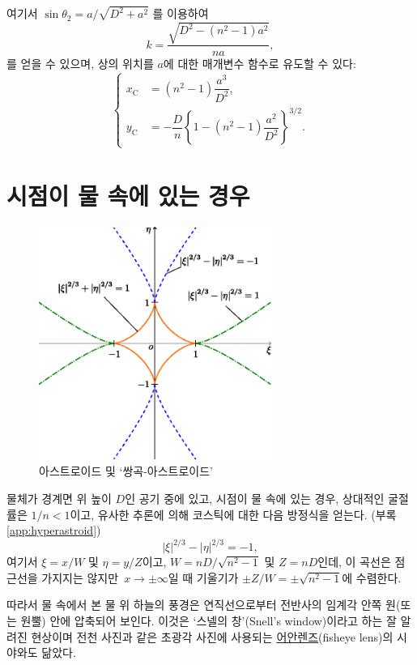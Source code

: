 \documentclass[twocolumn]{article}
\begin{document}
여기서
$\sin\theta_2 = {a}/{\sqrt{D^2+a^2}}$
를 이용하여
$$k = \dfrac{\sqrt{D^2-(n^2-1)a^2}}{na},$$
를 얻을 수 있으며, 
상의 위치를 $a$에 대한 매개변수 함수로 유도할 수 있다:
$$ \left\{ 
\begin{aligned}
	x_{\mathrm{C}}^{} &= (n^2-1)\dfrac{a^3}{D^2},\\
	y_{\mathrm{C}}^{}
	&= -\dfrac{D}{n}\left\{ 1-(n^2-1)\dfrac{a^2}{D^2} \right\}^{3/2}.
\end{aligned}
\right.$$

\section{시점이 물 속에 있는 경우}

\begin{figure}
	\centering
	\includegraphics[width=3in]{figs/g254.eps}
	\caption{아스트로이드 및 `쌍곡-아스트로이드'}
	\label{fig:hyperastroid}
\end{figure}

물체가 경계면 위 높이 $D$인 공기 중에 있고, 
시점이 물 속에 있는 경우, 상대적인 굴절률은 $1/n < 1$이고, 
유사한 추론에 의해 코스틱에 대한 다음 방정식을 얻는다. (부록 \ref{app:hyperastroid})
$$ \left| \xi \right|^{2/3} - \left| \eta \right|^{2/3} = -1, $$
여기서 $\xi = {x}/{W} $ 및 $\eta = {y}/{Z}$이고, 
$W = {nD}/{\sqrt{n^2-1}}$ 및 $Z = nD$인데,  
이 곡선은 점근선을 가지지는 않지만 $x\rightarrow\pm\infty$일 때 
기울기가 $\pm Z/W = \pm \sqrt{n^2-1}$에 수렴한다.

따라서 물 속에서 본 물 위 하늘의 풍경은
연직선으로부터 전반사의 임계각 안쪽 원(또는 원뿔) 안에 압축되어 보인다. 이것은 
`스넬의 창'(Snell's window)이라고 하는 잘 알려진 현상이며 전천 사진과 같은 초광각 
사진에 사용되는 \href{https://ko.wikipedia.org/wiki/%EC%96%B4%EC%95%88_%EB%A0%8C%EC%A6%88}{어안렌즈}(fisheye lens)의 시야와도 닮았다.
\end{document}
